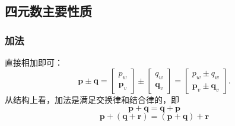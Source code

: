 \documentclass[10pt, a4paper]{article}
\begin{document}
  \subsection{四元数主要性质}
  \subsubsection{加法}
  直接相加即可：
  \begin{equation} \label{eq-9}
    \mathbf{p} \pm \mathbf{q} =
    \begin{bmatrix} p_w \\ \mathbf{p}_v \end{bmatrix} \pm \begin{bmatrix} q_w \\ \mathbf{q}_v \end{bmatrix} =
    \begin{bmatrix} p_w \pm q_w \\ \mathbf{p}_v \pm \mathbf{q}_v \end{bmatrix}.
  \end{equation}
  从结构上看，加法是满足交换律和结合律的，即
  \begin{equation} \label{eq-10} \mathbf{p} + \mathbf{q} = \mathbf{q} + \mathbf{p} \end{equation}
  \begin{equation} \label{eq-11} \mathbf{p} + (\mathbf{q} + \mathbf{r}) = (\mathbf{p} + \mathbf{q}) + \mathbf{r} \end{equation}
\end{document}
